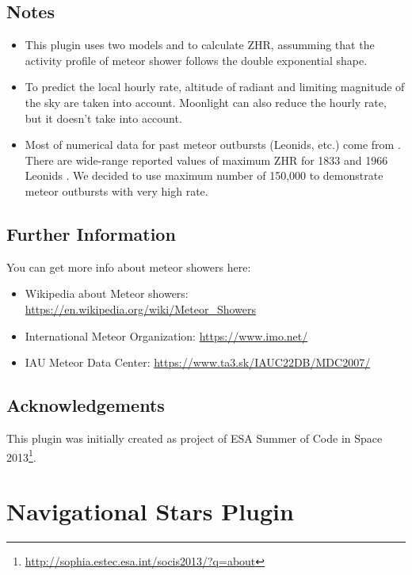 \subsection{Notes}
\begin{itemize}
\item This plugin uses two models \citep{1994A&A...287..990J} and \citep{1998Jenniskens} to calculate ZHR, assumming that the activity profile of meteor shower follows the double exponential shape.
\item To predict the local hourly rate, altitude of radiant and limiting magnitude of the sky are taken into account. Moonlight can also reduce the hourly rate, but it doesn't take into account.
\item Most of numerical data for past meteor outbursts (Leonids, etc.) come from \citep{2006Jenniskens.book}. There are wide-range reported values of maximum ZHR for 1833 and 1966 Leonids \citep{1999Brown}. We decided to use maximum number of 150,000 to demonstrate meteor outbursts with very high rate.
\end{itemize}

\subsection{Further Information}
\label{sec:plugins:MeteorShowers:Further}

You can get more info about meteor showers here:
\begin{itemize}
\item Wikipedia about Meteor showers: \url{https://en.wikipedia.org/wiki/Meteor_Showers}
\item International Meteor Organization: \url{https://www.imo.net/}
\item IAU Meteor Data Center: \url{https://www.ta3.sk/IAUC22DB/MDC2007/}
\end{itemize}

\subsection*{Acknowledgements}
This plugin was initially created as project of ESA Summer of Code in Space 2013\footnote{\url{http://sophia.estec.esa.int/socis2013/?q=about}}.


\newpage

\section{Navigational Stars Plugin}
\label{sec:plugins:NavigationalStars}

